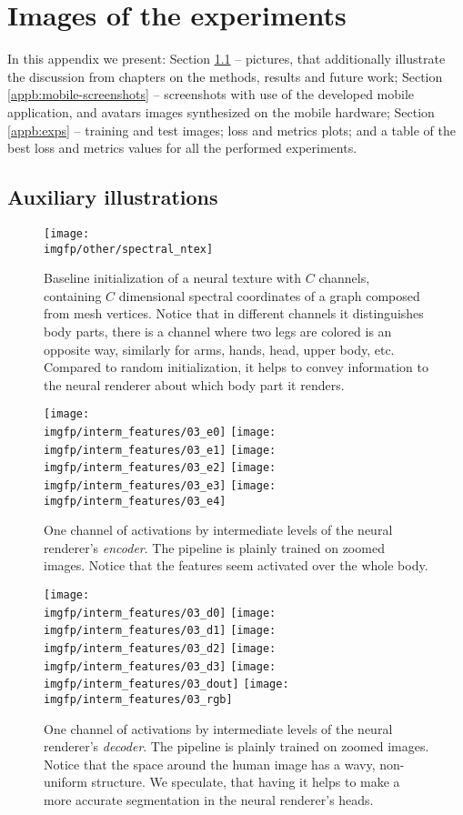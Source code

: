 \chapter{Images of the experiments}
In this appendix we present: Section \ref{appb:fig} -- pictures, that additionally illustrate the discussion from chapters on the methods, results and future work; Section \ref{appb:mobile-screenshots} -- screenshots with use of the developed mobile application, and avatars images synthesized on the mobile hardware; Section \ref{appb:exps} -- training and test images; loss and metrics plots; and a table of the best loss and metrics values for all the performed experiments.


\section{Auxiliary illustrations}
\label{appb:fig}
\begin{figure}[!h]
	\centering
	\texttt{[image: \\imgfp/other/spectral\_ntex]}
	\caption{Baseline initialization of a neural texture with $C$ channels, containing $C$ dimensional spectral coordinates of a graph composed from mesh vertices. Notice that in different channels it distinguishes body parts, there is a channel where two legs are colored is an opposite way, similarly for arms, hands, head, upper body, etc. Compared to random initialization, it helps to convey information to the neural renderer about which body part it renders.}
	\label{fig:spectral_ntex}
\end{figure}
\begin{figure}
	\centering
	\texttt{[image: \\imgfp/interm\_features/03\_e0]}%
	\hfill\texttt{[image: \\imgfp/interm\_features/03\_e1]}%
	\hfill\texttt{[image: \\imgfp/interm\_features/03\_e2]}%
	\hfill\texttt{[image: \\imgfp/interm\_features/03\_e3]}%
	\hfill\texttt{[image: \\imgfp/interm\_features/03\_e4]}%
	\caption{One channel of activations by intermediate levels of the neural renderer's \textit{encoder}. The pipeline is plainly trained on zoomed images. Notice that the features seem activated over the whole body.}
	\label{fig:interm03_encoder}
\end{figure}
\begin{figure}
	\centering
	\texttt{[image: \\imgfp/interm\_features/03\_d0]}%
	\hfill\texttt{[image: \\imgfp/interm\_features/03\_d1]}%
	\hfill\texttt{[image: \\imgfp/interm\_features/03\_d2]}%
	\hfill\texttt{[image: \\imgfp/interm\_features/03\_d3]}%
	\hfill\texttt{[image: \\imgfp/interm\_features/03\_dout]}%
	\hfill\texttt{[image: \\imgfp/interm\_features/03\_rgb]}
	\caption{One channel of activations by intermediate levels of the neural renderer's \textit{decoder}. The pipeline is plainly trained on zoomed images. Notice that the space around the human image has a wavy, non-uniform structure. We speculate, that having it helps to make a more accurate segmentation in the neural renderer's heads. }
	\label{fig:interm03_decoder}
\end{figure}
